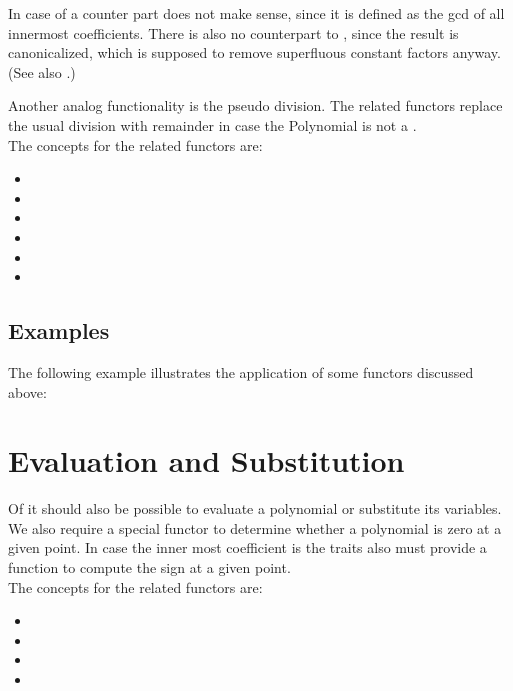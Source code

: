 In case of  a counter part does 
not make sense, since it is defined as the gcd of all innermost coefficients. 
There is also no counterpart to , since 
the result is canonicalized, which is supposed to remove superfluous constant factors 
anyway. (See also .)


Another analog functionality is the pseudo division. The related functors replace 
the usual division with remainder in case the Polynomial is not a . \\
The concepts for the related functors are: 
\begin{itemize}
\item {}
\item {}
\item {}
\item {}
\item {}
\item {}
\end{itemize}


\subsection{Examples}
The following example illustrates the application of some functors discussed above:

\section{Evaluation and Substitution}

Of it should also be possible to evaluate a polynomial or substitute its variables.
We also require a special functor to determine whether a polynomial is zero at a given point. 
In case the inner most coefficient is  the traits also must provide 
a function to compute the sign at a given point. \\
The concepts for the related functors are:
\begin{itemize}
\item {}
\item {}
\item {}
\item {}
\end{itemize}

